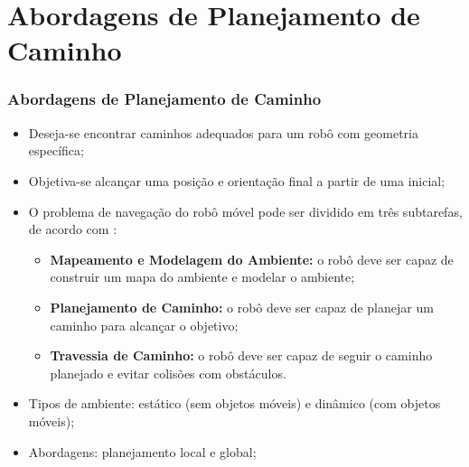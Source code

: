 \documentclass[xcolor=dvipsnames, aspectratio=169]{beamer}
\begin{document}
\section{Abordagens de Planejamento de Caminho}
\begin{frame}
  \frametitle{Abordagens de Planejamento de Caminho}
  \begin{itemize}
    \item Deseja-se encontrar caminhos adequados para um robô com geometria específica;
    \item Objetiva-se alcançar uma posição e orientação final a partir de uma inicial;
    \item O problema de navegação do robô móvel pode ser dividido em três subtarefas, de acordo com \cite{buniyamin2011simple}: 
    \begin{itemize}
      \item \textbf{Mapeamento e Modelagem do Ambiente:} o robô deve ser capaz de construir um mapa do ambiente e modelar o ambiente;
      \item \textbf{Planejamento de Caminho:} o robô deve ser capaz de planejar um caminho para alcançar o objetivo;
      \item \textbf{Travessia de Caminho:} o robô deve ser capaz de seguir o caminho planejado e evitar colisões com obstáculos.
    \end{itemize}
    \item Tipos de ambiente: estático (sem objetos móveis) e dinâmico (com objetos móveis);
    \item Abordagens: planejamento local e global;
  \end{itemize}
  
\end{frame}

\end{document}
